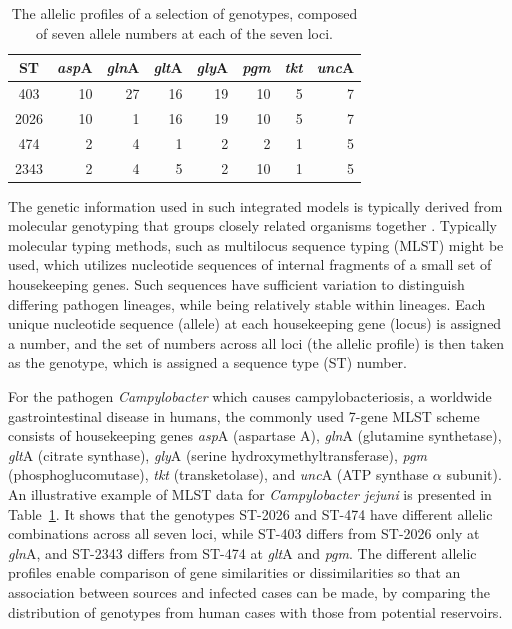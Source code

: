 \documentclass[AMA,STIX1COL]{WileyNJD-v2}
\begin{document}
\begin{table}
  \begin{center}
    \begin{tabular}{crrrrrrr}
      \toprule
      ST & \textit{asp}A & \textit{gln}A & \textit{glt}A & \textit{gly}A & \textit{pgm}& \textit{tkt}& \textit{unc}A\\ \midrule
      403 & 10 & 27 & 16 & 19 & 10 & 5 & 7\\
      2026 & 10 & 1 & 16 & 19 & 10 & 5 & 7\\
      474 & 2 & 4 & 1 & 2 & 2 & 1 & 5 \\
      2343 & 2 & 4 & 5 & 2 & 10 & 1 & 5\\
      \bottomrule
    \end{tabular}
  \end{center}
  \caption{The allelic profiles of a selection of genotypes, composed of seven allele numbers at each of the seven loci.}
  \label{tab:mlst}
\end{table}

The genetic information used in such integrated models is typically derived from molecular genotyping that groups closely related organisms together \cite{Cotta}. Typically molecular typing methods, such as multilocus sequence typing (MLST) \cite{Dingl, Coll, Urwin} might be used, which utilizes nucleotide sequences of internal fragments of a small set of housekeeping genes. Such sequences have sufficient variation to distinguish differing pathogen lineages, while being relatively stable within lineages. Each unique nucleotide sequence (allele) at each housekeeping gene (locus) is assigned a number, and the set of numbers across all loci (the allelic profile) is then taken as the genotype, which is assigned a sequence type (ST) number.

For the pathogen \textit{Campylobacter} which causes campylobacteriosis, a worldwide gastrointestinal disease in humans, the commonly used 7-gene MLST scheme consists of housekeeping genes \textit{asp}A (aspartase A), \textit{gln}A (glutamine synthetase), \textit{glt}A (citrate synthase), \textit{gly}A (serine hydroxymethyltransferase), \textit{pgm} (phosphoglucomutase), \textit{tkt} (transketolase), and \textit{unc}A (ATP synthase $\alpha$ subunit). An illustrative example of MLST data for \emph{Campylobacter jejuni} is presented in Table~\ref{tab:mlst}. It shows that the genotypes ST-2026 and ST-474 have different allelic combinations across all seven loci, while ST-403 differs from ST-2026 only at \textit{gln}A, and ST-2343 differs from ST-474 at \textit{glt}A and \textit{pgm}. The different allelic profiles enable comparison of gene similarities or dissimilarities so that an association between sources and infected cases can be made, by comparing the distribution of genotypes from human cases with those from potential reservoirs.
\end{document}
